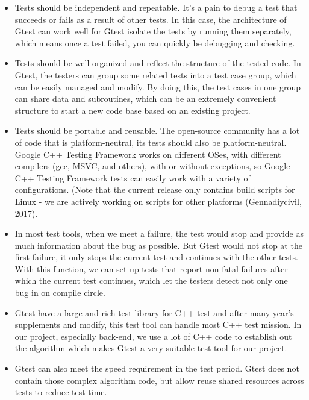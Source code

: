 \documentclass[11pt]{article}
\begin{document}
\begin{itemize}
\item 
Tests should be independent and repeatable. It's a pain to debug a test that succeeds or fails as a result of other tests. In this case, the architecture of Gtest can work well for Gtest isolate the tests by running them separately, which means once a test failed, you can quickly be debugging and checking.

\item
Tests should be well organized and reflect the structure of the tested code. In Gtest, the testers can group some related tests into a test case group, which can be easily managed and modify. By doing this, the test cases in one group can share data and subroutines, which can be an extremely convenient structure to start a new code base based on an existing project.

\item
Tests should be portable and reusable. The open-source community has a lot of code that is platform-neutral, its tests should also be platform-neutral. Google C++ Testing Framework works on different OSes, with different compilers (gcc, MSVC, and others), with or without exceptions, so Google C++ Testing Framework tests can easily work with a variety of configurations. (Note that the current release only contains build scripts for Linux - we are actively working on scripts for other platforms (Gennadiycivil, 2017).

\item
In most test tools, when we meet a failure, the test would stop and provide as much information about the bug as possible. But Gtest would not stop at the first failure, it only stops the current test and continues with the other tests. With this function, we can set up tests that report non-fatal failures after which the current test continues, which let the testers detect not only one bug in on compile circle.

\item
Gtest have a large and rich test library for C++ test and after many year’s supplements and modify, this test tool can handle most C++ test mission. In our project, especially back-end, we use a lot of C++ code to establish out the algorithm which makes Gtest a very suitable test tool for our project.

\item
Gtest can also meet the speed requirement in the test period. Gtest does not contain those complex algorithm code, but allow reuse shared resources across tests to reduce test time.

\end{itemize}
\end{document}
